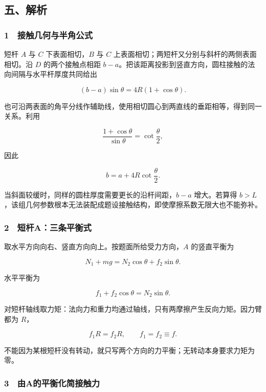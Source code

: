 \documentclass[12pt,a4paper,fontset=fandol]{ctexart}
\begin{document}
\subsection{五、解析}\label{ux4e94ux89e3ux6790-3}

\subsubsection{1　接触几何与半角公式}\label{ux63a5ux89e6ux51e0ux4f55ux4e0eux534aux89d2ux516cux5f0f}

短杆 \(A\) 与 \(C\) 下表面相切，\(B\) 与 \(C\)
上表面相切；两短杆又分别与斜杆的两侧表面相切。沿 \(D\) 的两个接触点相距
\(b-a\)。把该距离投影到竖直方向，圆柱接触的法向间隔与水平杆厚度共同给出

\[ (b-a)\sin\theta=4R(1+\cos\theta).\]

也可沿两表面的角平分线作辅助线，使用相切圆心到两直线的垂距相等，得到同一关系。利用

\[\frac{1+\cos\theta}{\sin\theta}=\cot\frac\theta2,\]

因此

\[\boxed{b=a+4R\cot\frac\theta2.}\]

当斜面较缓时，同样的圆柱厚度需要更长的沿杆间距，\(b-a\) 增大。若算得
\(b>L\)，该组几何参数根本无法装配成题设接触结构，即使摩擦系数无限大也不能弥补。

\subsubsection{2　短杆A：三条平衡式}\label{ux77edux6746aux4e09ux6761ux5e73ux8861ux5f0f}

取水平方向向右、竖直方向向上。按题面所给受力方向，\(A\) 的竖直平衡为

\[\boxed{N_1+mg=N_2\cos\theta+f_2\sin\theta.}\]

水平平衡为

\[\boxed{f_1+f_2\cos\theta=N_2\sin\theta.}\]

对短杆轴线取力矩：法向力和重力均通过轴线，只有两摩擦产生反向力矩。因力臂都为
\(R\)，

\[f_1R=f_2R,\qquad\boxed{f_1=f_2\equiv f.}\]

不能因为某根短杆没有转动，就只写两个方向的力平衡；无转动本身要求力矩为零。

\subsubsection{3　由A的平衡化简接触力}\label{ux7531aux7684ux5e73ux8861ux5316ux7b80ux63a5ux89e6ux529b}
\end{document}
